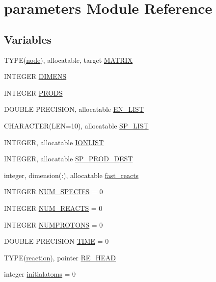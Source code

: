 \hypertarget{namespaceparameters}{
\section{parameters Module Reference}
\label{namespaceparameters}
}
\subsection*{Variables}
\begin{DoxyCompactItemize}
\item 
TYPE(\hyperlink{typetypedefs_1_1node}{node}), allocatable, target \hyperlink{namespaceparameters_a1d2ec6532bce135a8fc18f3542969a8d}{MATRIX}
\item 
INTEGER \hyperlink{namespaceparameters_a8eba14af35a7a362f50093f1acc28a78}{DIMENS}
\item 
INTEGER \hyperlink{namespaceparameters_a00c44079184906f8aff60ad7cea2fe4d}{PRODS}
\item 
DOUBLE PRECISION, allocatable \hyperlink{namespaceparameters_a41b06e1dd582bb56419bf991f2c633e3}{EN\_\-LIST}
\item 
CHARACTER(LEN=10), allocatable \hyperlink{namespaceparameters_a38878c1dc241cdcfc52f1804563f7b00}{SP\_\-LIST}
\item 
INTEGER, allocatable \hyperlink{namespaceparameters_a660ab08d014ed8f467dc504ed8585591}{IONLIST}
\item 
INTEGER, allocatable \hyperlink{namespaceparameters_a649c343c05b95e3f84d06401b3a3f6e1}{SP\_\-PROD\_\-DEST}
\item 
integer, dimension(:), allocatable \hyperlink{namespaceparameters_a8706bba63c5517e5b5e5b2cf0487db4b}{fast\_\-reacts}
\item 
INTEGER \hyperlink{namespaceparameters_aed3ebeff9daeb47edfa593ae2b72d4db}{NUM\_\-SPECIES} = 0
\item 
INTEGER \hyperlink{namespaceparameters_a1462d3a8d5ef4ee00ffc9c0beac695b2}{NUM\_\-REACTS} = 0
\item 
INTEGER \hyperlink{namespaceparameters_abf21c9c60fbc062ca9e84d2746c7388a}{NUMPROTONS} = 0
\item 
DOUBLE PRECISION \hyperlink{namespaceparameters_acf1d338d691bf2082aeabaec6ac27263}{TIME} = 0
\item 
TYPE(\hyperlink{typetypedefs_1_1reaction}{reaction}), pointer \hyperlink{namespaceparameters_aff68a046aeb1fa2a7610db8cd55922d8}{RE\_\-HEAD}
\item 
integer \hyperlink{namespaceparameters_a2a130bb0e6ad790a2a783d19749cc8ce}{initialatoms} = 0

\end{DoxyCompactItemize}
